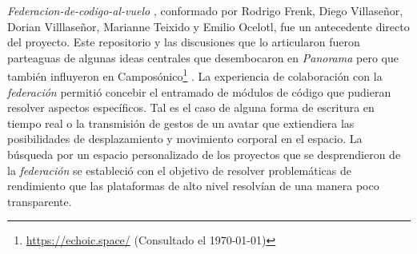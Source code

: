 \textit{Federacion-de-codigo-al-vuelo} \citep{en-vivo}, conformado por Rodrigo Frenk, Diego Villaseñor, Dorian Villlaseñor, Marianne Teixido y Emilio Ocelotl, fue un antecedente directo del proyecto. Este repositorio y las discusiones que lo articularon fueron parteaguas de algunas ideas centrales que desembocaron en \textit{Panorama} pero que también influyeron en Camposónico\footnote{\url{https://echoic.space/} (Consultado el \today)} \citep{camposonico}. La experiencia de colaboración con la \textit{federación} permitió concebir el entramado de módulos de código que pudieran resolver aspectos específicos. Tal es el caso de alguna forma de escritura en tiempo real o la transmisión de gestos de un avatar que extiendiera las posibilidades de desplazamiento y movimiento corporal en el espacio. La búsqueda por un espacio personalizado de los proyectos que se desprendieron de la \textit{federación} se estableció con el objetivo de resolver problemáticas de rendimiento que las plataformas de alto nivel resolvían de una manera poco transparente. 



